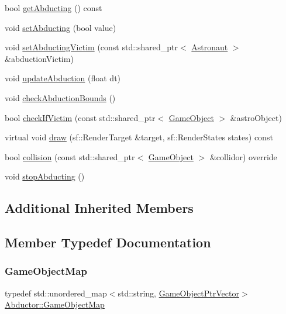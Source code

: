 \begin{DoxyCompactItemize}
\item 
bool \hyperlink{class_abductor_ac0c62963a2e8bdac8c34bfb2a2c0b868}{get\+Abducting} () const
\item 
void \hyperlink{class_abductor_a1069f5de8e0696be938a741f4b931855}{set\+Abducting} (bool value)
\item 
void \hyperlink{class_abductor_a20e45bb3b4a18f7d5baeb697d1e5b1d5}{set\+Abducting\+Victim} (const std\+::shared\+\_\+ptr$<$ \hyperlink{class_astronaut}{Astronaut} $>$ \&abduction\+Victim)
\item 
void \hyperlink{class_abductor_aa9e1628fe605674f599b1ff535c31ac1}{update\+Abduction} (float dt)
\item 
void \hyperlink{class_abductor_a1a0d06816d3572995a0ce1e0426c6d68}{check\+Abduction\+Bounds} ()
\item 
bool \hyperlink{class_abductor_acbe9315d3199bb9231c0a3d45d07d8f6}{check\+If\+Victim} (const std\+::shared\+\_\+ptr$<$ \hyperlink{class_game_object}{Game\+Object} $>$ \&astro\+Object)
\item 
virtual void \hyperlink{class_abductor_aebaf5c5a2882f41c8e1ed1b18f80e3d1}{draw} (sf\+::\+Render\+Target \&target, sf\+::\+Render\+States states) const
\item 
bool \hyperlink{class_abductor_a247dff8e49fc656700c8cb16ed08252d}{collision} (const std\+::shared\+\_\+ptr$<$ \hyperlink{class_game_object}{Game\+Object} $>$ \&collidor) override
\item 
void \hyperlink{class_abductor_ac30f2067a89f27befe9651cae8b5bca6}{stop\+Abducting} ()
\end{DoxyCompactItemize}
\subsection*{Additional Inherited Members}


\subsection{Member Typedef Documentation}
\mbox{\label{class_abductor_a15ce0d62a23ac0c3e335874ff4286f5f}} 
\subsubsection{\texorpdfstring{Game\+Object\+Map}{GameObjectMap}}
{\footnotesize\ttfamily typedef std\+::unordered\+\_\+map$<$std\+::string, \hyperlink{class_abductor_a2fc54e0ab08037996dd212d4d2d0443f}{Game\+Object\+Ptr\+Vector}$>$ \hyperlink{class_abductor_a15ce0d62a23ac0c3e335874ff4286f5f}{Abductor\+::\+Game\+Object\+Map}}

